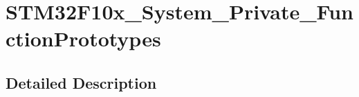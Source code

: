 \hypertarget{group___s_t_m32_f10x___system___private___function_prototypes}{\section{S\-T\-M32\-F10x\-\_\-\-System\-\_\-\-Private\-\_\-\-Function\-Prototypes}
\label{group___s_t_m32_f10x___system___private___function_prototypes}
}


\subsection{Detailed Description}
